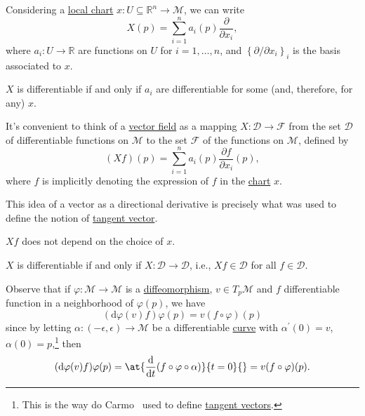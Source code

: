 Considering a \hyperref[def:coordinate-chart]{local chart} \(x\colon U \subseteq \mathbb{R} ^n \to \mathcal{M} \), we can write
\[
	X(p) = \sum_{i=1}^{n} a_i(p) \frac{\partial }{\partial x_i},
\]
where \(a_i\colon U \to \mathbb{R} \) are functions on \(U\) for \(i = 1, \ldots , n\), and \(\left\{ \partial / \partial x_i \right\}_{i} \) is the basis associated to \(x\).

\begin{remark}
	\(X\) is differentiable if and only if \(a_i\) are differentiable for some (and, therefore, for any) \(x\).
\end{remark}

It's convenient to think of a \hyperref[def:vector-field]{vector field} as a mapping \(X\colon \mathcal{D} \to \mathcal{F} \) from the set \(\mathcal{D} \) of differentiable functions on \(\mathcal{M} \) to the set \(\mathcal{F} \) of the functions on \(\mathcal{M} \), defined by
\[
	(Xf)(p) = \sum_{i=1}^{n} a_i(p)\frac{\partial f}{\partial x_i} (p),
\]
where \(f\) is implicitly denoting the expression of \(f\) in the \hyperref[def:coordinate-chart]{chart} \(x\).

\begin{intuition}
	This idea of a vector as a directional derivative is precisely what was used to define the notion of \hyperref[def:tangent-vector]{tangent vector}.
\end{intuition}

\begin{remark}
	\(Xf\) does not depend on the choice of \(x\).
\end{remark}

\begin{remark}
	\(X\) is differentiable if and only if \(X\colon \mathcal{D} \to \mathcal{D} \), i.e., \(Xf\in \mathcal{D} \) for all \(f\in \mathcal{D} \).
\end{remark}

Observe that if \(\varphi \colon \mathcal{M} \to \mathcal{M} \) is a \hyperref[def:diffeomorphism]{diffeomorphism}, \(v\in T_p \mathcal{M} \)  and \(f\) differentiable function in a neighborhood of \(\varphi (p)\), we have
\[
	(\mathrm{d} \varphi (v)f)\varphi (p) = v(f\circ \varphi )(p)
\]
since by letting \(\alpha \colon (-\epsilon , \epsilon ) \to \mathcal{M} \) be a differentiable \hyperref[def:curve]{curve} with \(\alpha ^\prime (0) = v\), \(\alpha (0)= p\),\footnote{This is the way do Carmo~\cite{flaherty2013riemannian} used to define \hyperref[def:tangent-vector]{tangent vectors}.} then
\[
	(\mathrm{d} \varphi (v) f) \varphi (p) = \at{\frac{\mathrm{d}}{\mathrm{d}t} (f \circ \varphi \circ \alpha )}{t=0}{} = v(f \circ \varphi )(p).
\]

